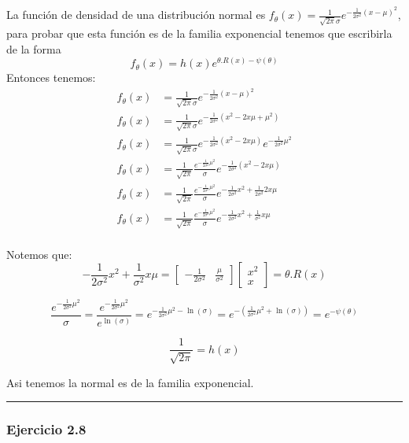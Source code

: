 \documentclass[12pt,]{article}
\begin{document}
La función de densidad de una distribución normal es
\(f_\theta(x)=\frac{1}{\sqrt{2\pi}\sigma}e^{-\frac{1}{2\sigma^2}(x-\mu)^2}\),
para probar que esta función es de la familia exponencial tenemos que
escribirla de la forma
\[f_\theta(x)=h(x)e^{\theta . R(x)-\psi(\theta)}\] Entonces tenemos: \[
\begin{array}{rl}
f_\theta(x) & =\frac{1}{\sqrt{2\pi}\sigma}e^{-\frac{1}{2\sigma^2}(x-\mu)^2}\\
f_\theta(x) & =\frac{1}{\sqrt{2\pi}\sigma}e^{-\frac{1}{2\sigma^2}(x^2-2x\mu+\mu^2)}\\
f_\theta(x) & =\frac{1}{\sqrt{2\pi}\sigma} e^{-\frac{1}{2\sigma^2}(x^2-2x\mu)}e^{-\frac{1}{2\sigma^2} \mu^2}\\
f_\theta(x) & =\frac{1}{\sqrt{2\pi}}\frac{e^{-\frac{1}{2\sigma^2} \mu^2}}{\sigma} e^{-\frac{1}{2\sigma^2}(x^2-2x\mu)}\\
f_\theta(x) & =\frac{1}{\sqrt{2\pi}}\frac{e^{-\frac{1}{2\sigma^2} \mu^2}}{\sigma} e^{-\frac{1}{2\sigma^2}x^2+\frac{1}{2\sigma^2}2x\mu}\\
f_\theta(x) & =\frac{1}{\sqrt{2\pi}}\frac{e^{-\frac{1}{2\sigma^2} \mu^2}}{\sigma} e^{-\frac{1}{2\sigma^2}x^2+\frac{1}{\sigma^2}x\mu}\\
\end{array}
\]

Notemos que: \[
\displaystyle -\frac{1}{2\sigma^2}x^2+\frac{1}{\sigma^2}x\mu = \begin{bmatrix}
-\frac{1}{2\sigma^2} & \frac{\mu}{\sigma^2}
\end{bmatrix} 
\begin{bmatrix}
x^2 \\ x
\end{bmatrix} = \theta. R(x)
\]

\[\displaystyle \frac{e^{-\frac{1}{2\sigma^2} \mu^2}}{\sigma}=\frac{e^{-\frac{1}{2\sigma^2} \mu^2}}{e^{\ln(\sigma)}}= e^{-\frac{1}{2\sigma^2} \mu^2-\ln(\sigma)}=e^{-\left(\frac{1}{2\sigma^2} \mu^2+\ln(\sigma)\right)}= e^{-\psi(\theta)}\]

\[\frac{1}{\sqrt{2\pi}}=h(x)\]

Asi tenemos la normal es de la familia exponencial.

\begin{center}\rule{0.5\linewidth}{\linethickness}\end{center}

\subsubsection{Ejercicio 2.8}\label{ejercicio-2.8}
\end{document}
